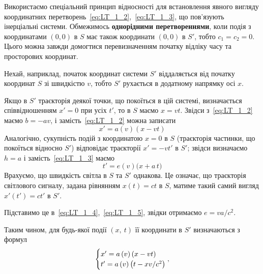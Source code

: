 Використаємо спеціальний принцип відносності для встановлення явного вигляду координатних
перетворень~\eqref{eq:LT_1_2},~\eqref{eq:LT_1_3}, що пов'язують інерціальні системи. Обмежимось \textbf{однорідними
перетвореннями}, коли подія з координатами $(0,0)$ в $S$ має також координати $(0,0)$ в $S'$, тобто $c_1=c_2=0$. Цього
можна завжди домогтися перевизначенням початку відліку часу та просторових координат.

Нехай, наприклад, початок координат системи $S'$ віддаляється від початку координат  $S$ зі швидкістю $v$, тобто $S'$
рухається в додатному напрямку осі $x$.

Якщо в $S'$ траєкторія деякої точки, що покоїться в цій системі, визначається співвідношенням $x'=0$ при усіх $t'$, то в
$S$ маємо $x=vt$. Звідси з~\eqref{eq:LT_1_2} маємо $b=-av$, і замість~\eqref{eq:LT_1_2} можна записати
\begin{equation} \label{eq:LT_1_4}
	x'=a(v)(x-vt)
\end{equation}
Аналогічно, сукупність подій з координатою $x=0$ в $S$ (траєкторія частинки, що покоїться відносно $S'$) відповідає
траєкторії $x'=-vt'$ в $S'$; звідси визначаємо $h=a$ і замість~\eqref{eq:LT_1_3} маємо
\begin{equation} \label{eq:LT_1_5}
	t' = e(v)\bigl(x + a\,t\bigr)
\end{equation}
Врахуємо, що швидкість світла в $S$ та $S'$ однакова. Це означає, що траєкторія світлового сигналу, задана рівнянням
$x(t)=ct$ в $S$, матиме такий самий вигляд $x'(t')=ct'$ в $S'$.

Підставимо це в~\eqref{eq:LT_1_4},~\eqref{eq:LT_1_5}, звідки отримаємо $e=va/c^2$.

Таким чином, для будь-якої події $(x,\ t)$ її координати в $S'$ визначаються з формул
\begin{equation} \label{eq:LT_1_6}
\begin{cases}
    	x'=a\left(v\right)\left(x-vt\right) \\
		t'=a\left(v\right)\left(t-xv/c^2\right)
\end{cases}\kern-1em,
\end{equation}

